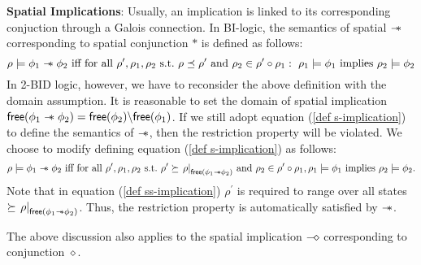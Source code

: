 \documentclass[conference,compsoc, 10pt]{IEEEtran}
\newcommand {\rt }[2] {{\left.{#1}\right|_{#2}}}
\newcommand {\V }[1] {{\mathsf{free}{\left(#1\right)}}}
\newcommand {\sepimp} {\mathrel{-\mkern-6mu*}}
\newcommand{\sd}{\diamond}%
\newcommand {\sdimp} {\mathrel{-\mkern-2.5mu\diamond}}
\begin{document}
\begin{appendices}
		\vspace{0.15cm}
		
		\noindent\textbf{Spatial Implications}: Usually, an implication is linked to its corresponding conjuction through a Galois connection. In BI-logic, the semantics of spatial $\sepimp$ corresponding to spatial conjunction $\ast$ is defined as follows:
		\begin{equation}
		\label{def s-implication}
		\rho\models \phi_1\sepimp\phi_2\ \text{iff\ for\ all}\ \rho^\prime,\rho_1,\rho_2\ \text{s.t.}\ \rho\preceq \rho^\prime\ \text{and}\ \rho_2\in \rho^\prime\circ \rho_1:\ \rho_1\models \phi_1\ \text{implies}\ \rho_2\models \phi_2 %
		\end{equation}
		In 2-BID logic, however, we have to reconsider the above definition with the domain assumption. It is reasonable to set the domain of spatial implication $\V{\phi_1\sepimp\phi_2} = \V{\phi_2}\backslash \V{\phi_1}$. If we still adopt equation (\ref{def s-implication}) to define the semantics of $\sepimp$, then the   restriction property will be violated. We choose to modify defining equation (\ref{def s-implication}) as follows:
		\begin{equation}
		\label{def ss-implication}
		\rho\models \phi_1\sepimp\phi_2 \ \text{iff\ for\ all}\ \rho^\prime,\rho_1,\rho_2\ \text{s.t.}\ \rho^\prime\succeq \rt{\rho}{\V{\phi_1\sepimp\phi_2}}\ \text{and}\ \rho_2\in \rho^\prime\circ \rho_1, \rho_1\models \phi_1\ \text{implies}\ \rho_2\models \phi_2.
		\end{equation}
		Note that in equation (\ref{def ss-implication}) $\rho^\prime$ is required to range over all states $\succeq \rt{\rho}{\V{\phi_1\sepimp\phi_2}}$. Thus, the restriction property is automatically satisfied by $\sepimp$.
		
		The above discussion also applies to the spatial implication $\sdimp$ corresponding to  conjunction $\sd$. 
		

\end{appendices}
\end{document}
